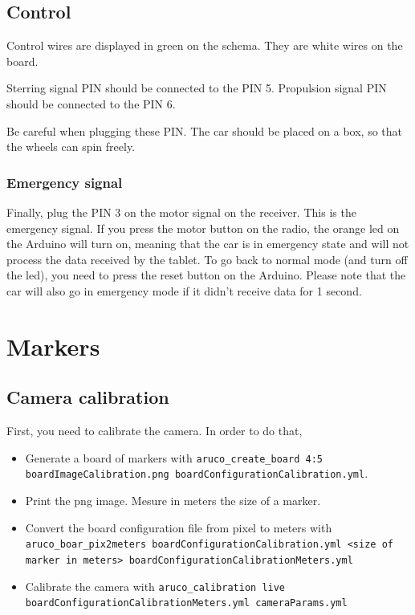 \documentclass[a4paper,11pt]{report}
\begin{document}
\subsection{Control}

Control wires are displayed in green on the schema. They are white wires on the
board.

Sterring signal PIN should be connected to the PIN 5.
Propulsion signal PIN should be connected to the PIN 6.

Be careful when plugging these PIN. The car should be placed on a box, so that
the wheels can spin freely.

\subsubsection{Emergency signal}

Finally, plug the PIN 3 on the motor signal on the receiver. This is the
emergency signal. If you press the motor button on the radio, the orange led on
the Arduino will turn on, meaning that the car is in emergency state and will not
process the data received by the tablet. To go back to normal mode (and turn
off the led), you need to press the reset button on the Arduino. Please note
that the car will also go in emergency mode if it didn't receive data for 1
second.

\section{Markers}

\subsection{Camera calibration}
\label{subsec:cam}

First, you need to calibrate the camera. In order to do that, \begin{itemize}

    \item Generate a board of markers with \texttt{aruco\_create\_board 4:5
        boardImageCalibration.png boardConfigurationCalibration.yml}.

    \item Print the png image. Mesure in meters the size of a marker.

    \item Convert the board configuration file from pixel to meters with
        \texttt{aruco\_boar\_pix2meters boardConfigurationCalibration.yml <size
        of marker in meters> boardConfigurationCalibrationMeters.yml}

    \item Calibrate the camera with \texttt{aruco\_calibration live
        boardConfigurationCalibrationMeters.yml cameraParams.yml}

\end{itemize}
\end{document}

